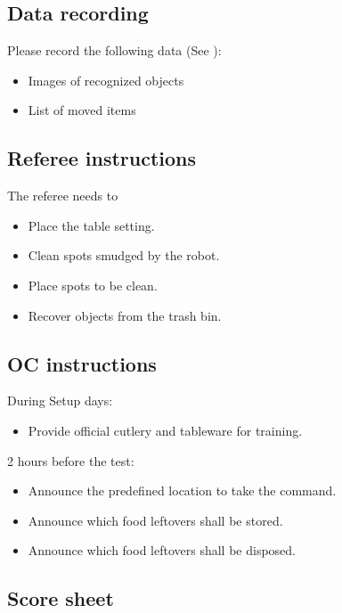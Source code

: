 \subsection{Data recording}
  Please record the following data (See ):
  \begin{itemize}
   \item Images of recognized objects
   \item List of moved items
  \end{itemize}

\subsection{Referee instructions}

The referee needs to
\begin{itemize}
	\item Place the table setting.
	\item Clean spots smudged by the robot.
	\item Place spots to be clean.
	\item Recover objects from the trash bin.
\end{itemize}

\subsection{OC instructions}
During Setup days:
\begin{itemize}
	\item Provide official cutlery and tableware for training.
\end{itemize}

2 hours before the test:
\begin{itemize}
	\item Announce the predefined location to take the command.
	\item Announce which food leftovers shall be stored.
	\item Announce which food leftovers shall be disposed.
\end{itemize}

\newpage
\subsection{Score sheet}



